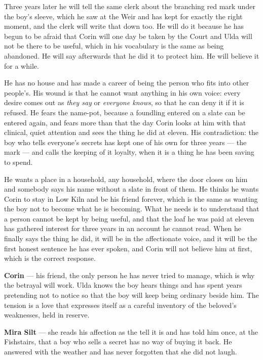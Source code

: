 \documentclass{design/chronicle}
\begin{document}
{Three years later he will tell the same clerk about the branching red mark under the boy’s sleeve, which he saw at the Weir and has kept for exactly the right moment, and the clerk will write that down too. He will do it because he has begun to be afraid that Corin will one day be taken by the Court and Ulda will not be there to be useful, which in his vocabulary is the same as being abandoned. He will say afterwards that he did it to protect him. He will believe it for a while.

He has no house and has made a career of being the person who fits into other people’s. His wound is that he cannot want anything in his own voice: every desire comes out as \emph{they say} or \emph{everyone knows}, so that he can deny it if it is refused. He fears the name-pot, because a foundling entered on a slate can be entered again, and fears more than that the day Corin looks at him with that clinical, quiet attention and sees the thing he did at eleven. His contradiction: the boy who tells everyone’s secrets has kept one of his own for three years — the mark — and calls the keeping of it loyalty, when it is a thing he has been saving to spend.

He wants a place in a household, any household, where the door closes on him and somebody says his name without a slate in front of them. He thinks he wants Corin to stay in Low Kiln and be his friend forever, which is the same as wanting the boy not to become what he is becoming. What he needs is to understand that a person cannot be kept by being useful, and that the loaf he was paid at eleven has gathered interest for three years in an account he cannot read. When he finally says the thing he did, it will be in the affectionate voice, and it will be the first honest sentence he has ever spoken, and Corin will not believe him at first, which is the correct response.

\textbf{Corin} — his friend, the only person he has never tried to manage, which is why the betrayal will work. Ulda knows the boy hears things and has spent years pretending not to notice so that the boy will keep being ordinary beside him. The tension is a love that expresses itself as a careful inventory of the beloved’s weaknesses, held in reserve.

\textbf{Mira Silt} — she reads his affection as the tell it is and has told him once, at the Fishstairs, that a boy who sells a secret has no way of buying it back. He answered with the weather and has never forgotten that she did not laugh.

}
\end{document}
